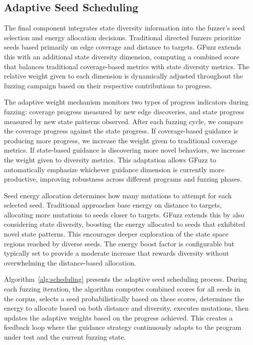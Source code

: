 \documentclass[review]{elsarticle}
\begin{document}
\subsection{Adaptive Seed Scheduling}

The final component integrates state diversity information into the fuzzer's seed selection and energy allocation decisions. Traditional directed fuzzers prioritize seeds based primarily on edge coverage and distance to targets. GFuzz extends this with an additional state diversity dimension, computing a combined score that balances traditional coverage-based metrics with state diversity metrics. The relative weight given to each dimension is dynamically adjusted throughout the fuzzing campaign based on their respective contributions to progress.

The adaptive weight mechanism monitors two types of progress indicators during fuzzing: coverage progress measured by new edge discoveries, and state progress measured by new state patterns observed. After each fuzzing cycle, we compare the coverage progress against the state progress. If coverage-based guidance is producing more progress, we increase the weight given to traditional coverage metrics. If state-based guidance is discovering more novel behaviors, we increase the weight given to diversity metrics. This adaptation allows GFuzz to automatically emphasize whichever guidance dimension is currently more productive, improving robustness across different programs and fuzzing phases.

Seed energy allocation determines how many mutations to attempt for each selected seed. Traditional approaches base energy on distance to targets, allocating more mutations to seeds closer to targets. GFuzz extends this by also considering state diversity, boosting the energy allocated to seeds that exhibited novel state patterns. This encourages deeper exploration of the state space regions reached by diverse seeds. The energy boost factor is configurable but typically set to provide a moderate increase that rewards diversity without overwhelming the distance-based allocation.

Algorithm~\ref{alg:scheduling} presents the adaptive seed scheduling process. During each fuzzing iteration, the algorithm computes combined scores for all seeds in the corpus, selects a seed probabilistically based on these scores, determines the energy to allocate based on both distance and diversity, executes mutations, then updates the adaptive weights based on the progress achieved. This creates a feedback loop where the guidance strategy continuously adapts to the program under test and the current fuzzing state.
\end{document}
